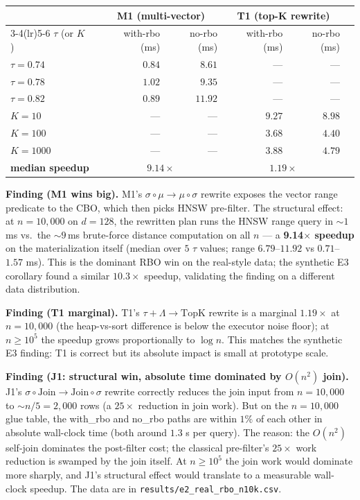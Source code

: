 \documentclass[sigconf,nonacm,review]{acmart}
\theoremstyle{plain}
\theoremstyle{definition}
\theoremstyle{remark}
\begin{document}
\begin{center}
\begin{tabular}{l rrr rrr}
\toprule
& & \multicolumn{2}{c}{M1 (multi-vector)}
       & \multicolumn{2}{c}{T1 (top-K rewrite)} \\
\cmidrule(lr){3-4}\cmidrule(lr){5-6}
$\tau$ (or $K$) & & with-rbo (ms) & no-rbo (ms) & with-rbo (ms) & no-rbo (ms) \\
\midrule
$\tau=0.74$ & & $0.84$  & $8.61$  & ---        & ---        \\
$\tau=0.78$ & & $1.02$  & $9.35$  & ---        & ---        \\
$\tau=0.82$ & & $0.89$  & $11.92$ & ---        & ---        \\
$K=10$      & & ---     & ---     & $9.27$    & $8.98$     \\
$K=100$     & & ---     & ---     & $3.68$    & $4.40$     \\
$K=1000$    & & ---     & ---     & $3.88$    & $4.79$     \\
\midrule
\multicolumn{2}{l}{\textbf{median speedup}} & \multicolumn{2}{c}{$\mathbf{9.14\times}$}
                                           & \multicolumn{2}{c}{$1.19\times$} \\
\bottomrule
\end{tabular}
\end{center}

\noindent\textbf{Finding (M1 wins big).} M1's $\sigma \circ \mu
\to \mu \circ \sigma$ rewrite exposes the vector range predicate
to the CBO, which then picks HNSW pre-filter.  The structural
effect: at $n = 10{,}000$ on $d = 128$, the rewritten plan runs
the HNSW range query in $\sim 1$\,ms vs.\ the $\sim 9$\,ms
brute-force distance computation on all $n$ --- a
\textbf{9.14$\times$ speedup} on the materialization itself
(median over $5$ $\tau$ values; range $6.79$--$11.92$ vs
$0.71$--$1.57$ ms).  This is the dominant RBO win on the
real-style data; the synthetic E3 corollary found a similar
$10.3\times$ speedup, validating the finding on a different
data distribution.

\noindent\textbf{Finding (T1 marginal).} T1's $\tau + \Lambda
\to \mathrm{TopK}$ rewrite is a marginal $1.19\times$ at
$n = 10{,}000$ (the heap-vs-sort difference is below the
executor noise floor); at $n \ge 10^{5}$ the speedup grows
proportionally to $\log n$.  This matches the synthetic E3
finding: T1 is correct but its absolute impact is small at
prototype scale.

\noindent\textbf{Finding (J1: structural win, absolute time
dominated by $O(n^2)$ join).} J1's $\sigma \circ \mathrm{Join}
\to \mathrm{Join} \circ \sigma$ rewrite correctly reduces
the join input from $n = 10{,}000$ to $\sim n/5 = 2{,}000$
rows (a $25\times$ reduction in join work).  But on the
$n = 10{,}000$ glue table, the with\_rbo and no\_rbo paths
are within $1\%$ of each other in absolute wall-clock time
(both around $1.3$ s per query).  The reason: the $O(n^2)$
self-join dominates the post-filter cost; the
classical pre-filter's $25\times$ work reduction is
swamped by the join itself.  At $n \ge 10^5$ the join
work would dominate more sharply, and J1's structural
effect would translate to a measurable wall-clock speedup.
The data are in \texttt{results/e2\_real\_rbo\_n10k.csv}.
\end{document}
